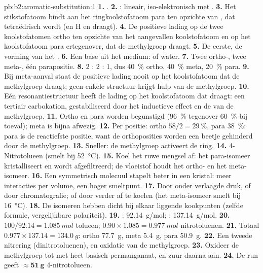 \begin{solution}{pb:b2:aromatic-substitution:1}
\textbf{1.} .
\textbf{2.} : lineair, iso-elektronisch met .
\textbf{3.} Het stikstofatoom bindt aan het ringkoolstofatoom para ten opzichte van , dat tetraëdrisch wordt
(en H en  draagt).
\textbf{4.} De positieve lading op de twee koolstofatomen ortho ten opzichte van het aangevallen koolstofatoom en op het
koolstofatoom para ertegenover, dat de methylgroep draagt.
\textbf{5.} De eerste, de vorming van het .
\textbf{6.} Een base uit het medium:  of water.
\textbf{7.} Twee ortho-, twee meta-, één parapositie.
\textbf{8.} 2 : 2 : 1, dus 40~\% ortho, 40~\% meta, 20~\% para.
\textbf{9.} Bij meta-aanval staat de positieve lading nooit op het koolstofatoom dat de methylgroep draagt; geen enkele
structuur krijgt hulp van de methylgroep.
\textbf{10.} Eén resonantiestructuur heeft de lading op het koolstofatoom dat  draagt: een tertiair
carbokation, gestabiliseerd door het inductieve effect en de  van de methylgroep.
\textbf{11.} Ortho en para worden begunstigd (96~\% tegenover 60~\% bij toeval); meta is bijna afwezig.
\textbf{12.} Per positie: ortho $58/2 = 29~\%$, para 38~\%: para is de reactiefste positie,
want de orthoposities worden een beetje gehinderd door de methylgroep.
\textbf{13.} Sneller: de methylgroep activeert de ring.
\textbf{14.} 4-Nitrotolueen (smelt bij \qty{52}{\degreeCelsius}).
\textbf{15.} Koel het ruwe mengsel af: het para-isomeer kristalliseert en wordt afgefiltreerd; de
vloeistof houdt het ortho- en het meta-isomeer.
\textbf{16.} Een symmetrisch molecuul stapelt beter in een kristal: meer interacties per volume,
een hoger smeltpunt.
\textbf{17.} Door  onder verlaagde druk, of door chromatografie; of door
verder af te koelen (het meta-isomeer smelt bij \qty{16}{\degreeCelsius}).
\textbf{18.} De isomeren hebben dicht bij elkaar liggende kookpunten (zelfde formule, vergelijkbare polariteit).
\textbf{19.} : \qty{92.14}{g/mol}; : \qty{137.14}{g/mol}.
\textbf{20.} $100/92.14 = \qty{1.085}{mol}$ tolueen; $0.90 \times 1.085 = \qty{0.977}{mol}$
nitrotoluenen.
\textbf{21.} Totaal $0.977 \times 137.14 = \qty{134.0}{g}$: ortho \qty{77.7}{g}, meta
\qty{5.4}{g}, para \qty{50.9}{g}.
\textbf{22.} Een tweede nitrering (dinitrotoluenen), en oxidatie van de methylgroep.
\textbf{23.} Oxideer de methylgroep tot  met heet basisch permanganaat, en zuur daarna aan.
\textbf{24.} De run geeft $\boldsymbol{\approx \qty{51}{g}}$ 4-nitrotolueen.
\end{solution}
